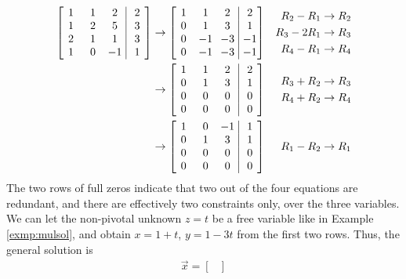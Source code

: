 \begin{solution}
\begin{align*}
\left[\begin{array}{@{\,}wc{10pt}wc{10pt}wc{10pt}|wc{10pt}@{\,}}
1 & 1 & 2 & 2 \\
1 & 2 & 5 & 3 \\
2 & 1 & 1 & 3 \\
1 & 0 & -1 & 1
\end{array}\right] 
& \to 
\left[\begin{array}{@{\,}wc{10pt}wc{10pt}wc{10pt}|wc{10pt}@{\,}}
1 & 1 & 2 & 2 \\
0 & 1 & 3 & 1 \\
0 & -1 & -3 & -1\\
0 & -1 & -3 & -1
\end{array}\right] 
& \begin{aligned}
R_2 - R_1 &\to R_2\\
R_3 - 2R_1 &\to R_3 \\
R_4 - R_1 &\to R_4
\end{aligned}\\ 
& \to 
\left[\begin{array}{@{\,}wc{10pt}wc{10pt}wc{10pt}|wc{10pt}@{\,}}
1 & 1 & 2 & 2 \\
0 & 1 & 3 & 1 \\
0 & 0 & 0 & 0 \\
0 & 0 & 0 & 0
\end{array}\right] 
& \begin{aligned}
R_3 + R_2 &\to R_3\\
R_4 + R_2 &\to R_4    
\end{aligned} \\
& \to 
\left[\begin{array}{@{\,}wc{10pt}wc{10pt}wc{10pt}|wc{10pt}@{\,}}
1 & 0 & -1 & 1 \\
0 & 1 & 3 & 1 \\
0 & 0 & 0 & 0 \\
0 & 0 & 0 & 0
\end{array}\right] 
& R_1- R_2 \to R_1 
\end{align*}
The two rows of full zeros indicate that two out of the four equations are redundant, and there are effectively two constraints only, over the three variables. We can let the non-pivotal unknown $z = t$ be a free variable like in Example \ref{exmp:mulsol}, and obtain $x = 1+t$, $y = 1-3t$ from the first two rows. Thus, the general solution is
\begin{align*}
\vec{x} = 
\begin{bmatrix}

\end{bmatrix}
\end{align*}
\end{solution}
